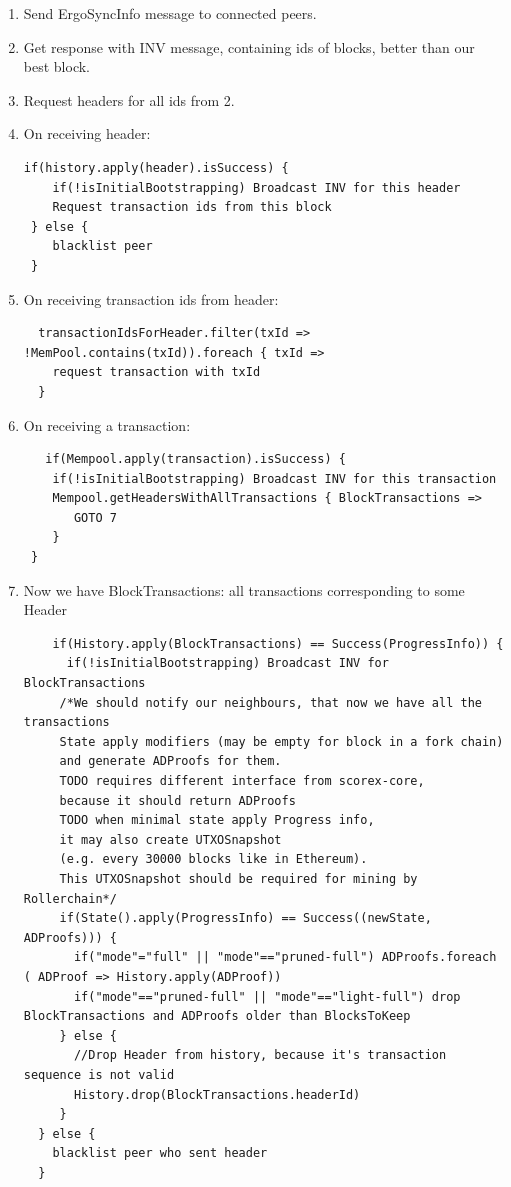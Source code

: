 \documentclass[]{article}   %
\begin{document}
\begin{enumerate}
   \item Send ErgoSyncInfo message to connected peers.
   \item Get response with INV message, containing ids of blocks, better than our best block.
   \item Request headers for all ids from 2.
   \item On receiving header:
   \begin{verbatim}
if(history.apply(header).isSuccess) {
    if(!isInitialBootstrapping) Broadcast INV for this header
    Request transaction ids from this block
 } else {
    blacklist peer
 }
\end{verbatim}
\vspace{1em}

   \item On receiving transaction ids from header:
   \begin{verbatim}
  transactionIdsForHeader.filter(txId => !MemPool.contains(txId)).foreach { txId =>
    request transaction with txId
  }
   \end{verbatim}
   \item On receiving a transaction:
   \begin{verbatim}
   if(Mempool.apply(transaction).isSuccess) {
    if(!isInitialBootstrapping) Broadcast INV for this transaction
    Mempool.getHeadersWithAllTransactions { BlockTransactions =>
       GOTO 7
    }
 }
   \end{verbatim}
   \item Now we have BlockTransactions: all transactions corresponding to some Header
   \begin{verbatim}
    if(History.apply(BlockTransactions) == Success(ProgressInfo)) {
      if(!isInitialBootstrapping) Broadcast INV for BlockTransactions
     /*We should notify our neighbours, that now we have all the transactions
     State apply modifiers (may be empty for block in a fork chain)
     and generate ADProofs for them.
     TODO requires different interface from scorex-core,
     because it should return ADProofs
     TODO when minimal state apply Progress info,
     it may also create UTXOSnapshot
     (e.g. every 30000 blocks like in Ethereum).
     This UTXOSnapshot should be required for mining by Rollerchain*/
     if(State().apply(ProgressInfo) == Success((newState, ADProofs))) {
       if("mode"="full" || "mode"=="pruned-full") ADProofs.foreach ( ADProof => History.apply(ADProof))
       if("mode"=="pruned-full" || "mode"=="light-full") drop BlockTransactions and ADProofs older than BlocksToKeep
     } else {
       //Drop Header from history, because it's transaction sequence is not valid
       History.drop(BlockTransactions.headerId)
     }
  } else {
    blacklist peer who sent header
  }
   \end{verbatim}
\end{enumerate}
\end{document}
